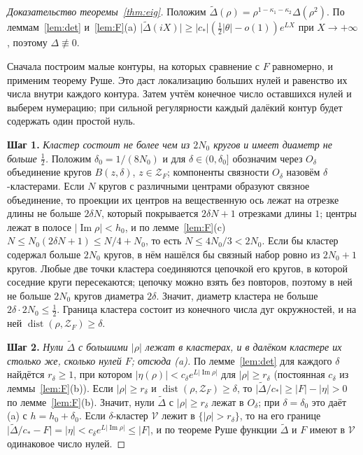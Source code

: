 \documentclass[12pt,a4paper]{article}
\numberwithin{equation}{section}
\theoremstyle{definition}
\newcommand{\step}[1]{\smallskip\noindent\textbf{Шаг #1.}}
\newcommand{\abs}[1]{\lvert#1\rvert}
\newcommand{\Imm}{\operatorname{Im}}
\newcommand{\Zf}{\mathcal Z_F}
\begin{document}
\begin{proof}[Доказательство теоремы~\ref{thm:eig}]
Положим $\widetilde\Delta(\rho)=\rho^{1-\kappa_1-\kappa_2}\Delta(\rho^2)$.
По леммам~\ref{lem:det} и~\ref{lem:F}(a)
$\abs{\widetilde\Delta(iX)}\ge\abs{c_\ast}(\frac12\abs\theta-o(1))e^{LX}$
при $X\to+\infty$, поэтому $\Delta\not\equiv0$.

Сначала построим малые контуры, на которых сравнение с $F$ равномерно,
и применим теорему Руше. Это даст локализацию больших нулей и равенство
их числа внутри каждого контура. Затем учтём конечное число оставшихся
нулей и выберем нумерацию; при сильной регулярности каждый далёкий
контур будет содержать один простой нуль.


\step{1} \textit{Кластер состоит не более чем из $2N_0$ кругов и имеет диаметр не больше
$\frac12$.} Положим $\delta_0=1/(8N_0)$ и для $\delta\in(0,\delta_0]$ обозначим через $O_\delta$
объединение кругов $B(z,\delta)$, $z\in\Zf$; компоненты связности $O_\delta$ назовём
$\delta$-кластерами. Если $N$ кругов
с различными центрами образуют связное объединение, то проекции их центров на вещественную ось
лежат на отрезке длины не больше $2\delta N$, который покрывается $2\delta N+1$ отрезками длины $1$;
центры лежат в полосе $\abs{\Imm\rho}<h_0$, и по лемме~\ref{lem:F}(c)
$N\le N_0(2\delta N+1)\le N/4+N_0$, то есть $N\le4N_0/3<2N_0$. Если бы кластер содержал больше
$2N_0$ кругов, в нём нашёлся бы связный набор ровно из $2N_0+1$ кругов. Любые две точки
кластера соединяются цепочкой его кругов, в которой соседние круги пересекаются; цепочку можно
взять без повторов, поэтому в ней не больше $2N_0$ кругов диаметра $2\delta$. Значит, диаметр
кластера не больше $2\delta\cdot2N_0\le\frac12$. Граница кластера состоит из конечного числа
дуг окружностей, и на ней $\operatorname{dist}(\rho,\Zf)\ge\delta$.

\step{2} \textit{Нули $\widetilde\Delta$ с большими $\abs\rho$ лежат в кластерах, и в далёком
кластере их столько же, сколько нулей $F$; отсюда (a).} По лемме~\ref{lem:det} для каждого
$\delta$ найдётся $r_\delta\ge1$, при котором $\abs{\eta(\rho)}<c_\delta e^{L\abs{\Imm\rho}}$ для
$\abs\rho\ge r_\delta$ (постоянная $c_\delta$ из леммы~\ref{lem:F}(b)). Если $\abs\rho\ge r_\delta$
и $\operatorname{dist}(\rho,\Zf)\ge\delta$, то
$\abs{\widetilde\Delta/c_\ast}\ge\abs F-\abs\eta>0$ по лемме~\ref{lem:F}(b). Значит, нули
$\widetilde\Delta$ с $\abs\rho\ge r_{\delta}$ лежат в $O_{\delta}$; при $\delta=\delta_0$ это даёт (a)
с $h=h_0+\delta_0$. Если $\delta$-кластер $\mathcal V$ лежит в
$\{\abs\rho>r_\delta\}$, то на его границе
$\abs{\widetilde\Delta/c_\ast-F}=\abs\eta<c_\delta e^{L\abs{\Imm\rho}}\le\abs F$, и по теореме Руше
функции $\widetilde\Delta$ и $F$ имеют в $\mathcal V$ одинаковое число нулей.


\end{proof}
\end{document}
